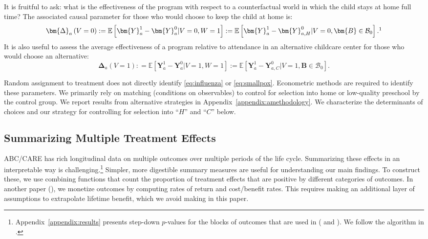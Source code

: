 It is fruitful to ask: what is the effectiveness of the program with respect to a counterfactual world in which the child stays at home full time? The associated causal parameter for those who would choose to keep the child at home is:
\begin{equation}\label{eq:influenza}
\bm{\Delta}_a \left(V = 0 \right) : =   \mathbb{E} \left[ \bm{Y}^1_a - \bm{Y}^0_a | V = 0, W = 1 \right] := \mathbb{E} \left[\bm{Y}^1_{a} - \bm{Y}^0_{a,H} | V = 0, \bm{B} \in \mathcal{B}_0 \right].\footnote{Appendix~\ref{appendix:vsensitivity-controlsub} displays results with alternative definitions of $V$ (i.e., different thresholds define if a child attended alternative preschool). The results are robust to the various definitions. What matters is whether any out-of-home child care is being used ($V>0$), and not the specific value of $V$.}
\end{equation}
It is also useful to assess the average effectiveness of a program relative to attendance in an alternative childcare center for those who would choose an alternative:
\begin{equation}\label{eq:smallpox}
\bm{\Delta}_a \left( V =1 \right) : =   \mathbb{E} \left[ \bm{Y}^1_a - \bm{Y}^0_a | V = 1, W = 1 \right] := \mathbb{E} \left[\bm{Y}^1_a - \bm{Y}^0_{a,C} | V = 1, \bm{B} \in \mathcal{B}_0 \right].
\end{equation}

Random assignment to treatment does not directly identify \eqref{eq:influenza} or \eqref{eq:smallpox}. Econometric methods are required to identify these parameters. We primarily rely on matching (conditions on observables) to control for selection into home or low-quality preschool by the control group. We report results from alternative strategies in Appendix~\ref{appendix:amethodology}. We characterize the determinants of choices and our strategy for controlling for selection into ``$H$'' and ``$C$'' below.

\subsection{Summarizing Multiple Treatment Effects}\label{sec:combining-functions}

ABC/CARE has rich longitudinal data on multiple outcomes over multiple periods of the life cycle. Summarizing these effects in an interpretable way is challenging.\footnote{Appendix~\ref{appendix:results} presents step-down $p$-values for the blocks of outcomes that are used in \citet{Garcia_Heckman_Leaf_etal_2017_Comp_CBA_Unpublished} (\citealp{Lehman_Romano_2005_AnnStat} and \citealp{Romano_Shaikh_2006_AnnStat}). We follow the algorithm in \citet{Romano_Wolf_2016_pval_SaPL}.} Simpler, more digestible summary measures are useful for understanding our main findings. To construct these, we use combining functions that count the proportion of treatment effects that are positive by different categories of outcomes. In another paper (\citealp{Garcia_Heckman_Leaf_etal_2017_Comp_CBA_Unpublished}), we monetize outcomes by computing rates of return and cost/benefit rates. This requires making an additional layer of assumptions to extrapolate lifetime benefit, which we avoid making in this paper.

